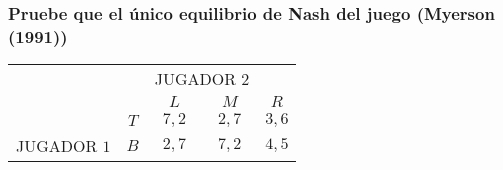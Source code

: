 \documentclass[12pt]{article}
\begin{document}
\subsubsection{Pruebe que el único equilibrio de Nash del juego (Myerson (1991))}
    \begin{center}    
        \setlength{\extrarowheight}{0pt}
        \begin{tabular}{cc|c|c|c|}
            & \multicolumn{1}{c}{} & \multicolumn{2}{c}{JUGADOR $2$}\\
            & \multicolumn{1}{c}{} & \multicolumn{1}{c}{$L$}  & \multicolumn{1}{c}{$M$} & \multicolumn{1}{c}{$R$} \\\cline{3-5}
            & $T$ & $7,2$ & $2,7$ & $3,6$ \\\cline{3-5}
            {JUGADOR $1$} & $B$ & $2,7$ & $7,2$ & $4,5$ \\\cline{3-5}
        \end{tabular}
    \end{center}
\end{document}
